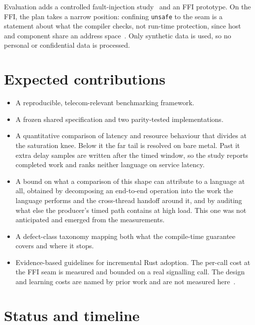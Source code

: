 \documentclass[11pt,a4paper]{article}
\newenvironment{tightitemize}
  {\begin{itemize}
     \setlength{\topsep}{2pt}\setlength{\itemsep}{0pt}
     \setlength{\parsep}{0pt}\setlength{\parskip}{0pt}}
  {\end{itemize}}
\begin{document}
Evaluation adds a controlled
fault-injection study~\cite{natella2016fault} and an FFI prototype. On the FFI,
the plan takes a narrow position: confining \texttt{unsafe} to the seam is a
statement about what the compiler checks, not run-time protection, since host
and component share an address space~\cite{rivera2021galeed}. Only synthetic
data is used, so no personal or confidential data is processed.

\section{Expected contributions}

\begin{tightitemize}
  \item A reproducible, telecom-relevant benchmarking framework.
  \item A frozen shared specification and two parity-tested implementations.
  \item A quantitative comparison of latency and resource behaviour that
  divides at the saturation knee. Below it the far tail is resolved on bare
  metal. Past it extra delay samples are written after the timed window,
  so the study reports completed work and ranks neither language on
  service latency.
  \item A bound on what a comparison of this shape can attribute to a language
  at all, obtained by decomposing an end-to-end operation into the work the
  language performs and the cross-thread handoff around it, and by auditing
  what else the producer's timed path contains at high load. This one was not
  anticipated and emerged from the measurements.
  \item A defect-class taxonomy mapping both what the compile-time guarantee
  covers and where it stops.
  \item Evidence-based guidelines for incremental Rust adoption. The per-call
  cost at the FFI seam is measured and bounded on a real signalling call. The
  design and learning costs are named by prior work and are not measured
  here~\cite{fulton2021adopting}.
\end{tightitemize}

\section{Status and timeline}
\end{document}
